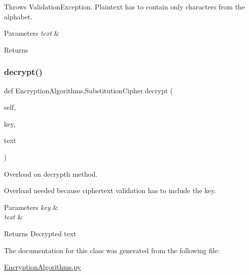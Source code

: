 Throws Validation\+Exception. Plaintext has to contain only characters from the alphabet.


\begin{DoxyParams}{Parameters}
{\em text} & \\
\hline
\end{DoxyParams}
\begin{DoxyReturn}{Returns}

\end{DoxyReturn}
\mbox{\label{classEncryptionAlgorithms_1_1SubstitutionCipher_ac8d0e10409c6dd0ac7cbb7bf94f4f2bd}} 
\subsubsection{\texorpdfstring{decrypt()}{decrypt()}}
{\footnotesize\ttfamily def Encryption\+Algorithms.\+Substitution\+Cipher.\+decrypt (\begin{DoxyParamCaption}\item[{}]{self,  }\item[{}]{key,  }\item[{}]{text }\end{DoxyParamCaption})}



Overload on decrypth method. 

Overload needed because ciphertext validation has to include the key.


\begin{DoxyParams}{Parameters}
{\em key} & \\
\hline
{\em text} & \\
\hline
\end{DoxyParams}
\begin{DoxyReturn}{Returns}
Decrypted text 
\end{DoxyReturn}


The documentation for this class was generated from the following file\+:\begin{DoxyCompactItemize}
\item 
\mbox{\hyperlink{EncryptionAlgorithms_8py}{Encryption\+Algorithms.\+py}}\end{DoxyCompactItemize}

